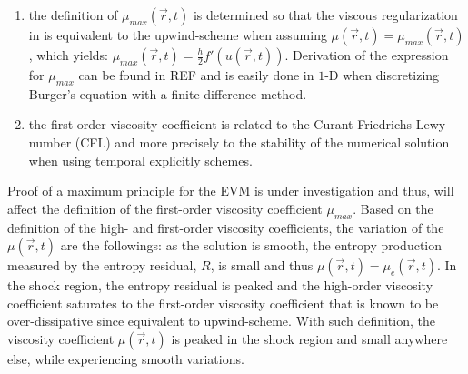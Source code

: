 \begin{enumerate}
\item the definition of $\mu_{max}(\vec{r},t)$ is determined so that the viscous regularization in  is equivalent to the upwind-scheme when assuming $\mu(\vec{r},t) = \mu_{max}(\vec{r},t)$, which yields: $\mu_{max}(\vec{r},t) = \frac{h}{2} f'(u(\vec{r},t))$. Derivation of the expression for $\mu_{max}$ can be found in REF and is easily done in $1$-D when discretizing Burger's equation with a finite difference method. 
\item the first-order viscosity coefficient is related to the Curant-Friedrichs-Lewy number (CFL) and more precisely to the stability of the numerical solution when using temporal explicitly schemes.
\end{enumerate}
Proof of a maximum principle for the EVM is under investigation and thus, will affect the definition of the first-order viscosity coefficient $\mu_{max}$. Based on the definition of the high- and first-order viscosity coefficients, the variation of the $\mu(\vec{r},t)$ are the followings: as the solution is smooth, the entropy production measured by the entropy residual, $R$, is small and thus $\mu(\vec{r},t) = \mu_e(\vec{r},t)$. In the shock region, the entropy residual is peaked and the high-order viscosity coefficient saturates to the first-order viscosity coefficient that is known to be over-dissipative since equivalent to upwind-scheme. With such definition, the viscosity coefficient $\mu(\vec{r},t)$ is peaked in the shock region and small anywhere else, while experiencing smooth variations. 

